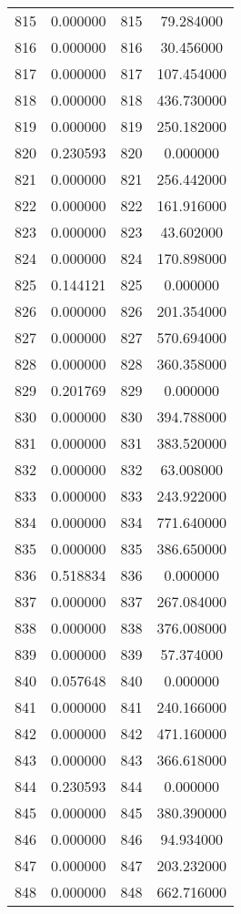\documentclass[12pt]{article}
\begin{document}
\begin{longtable}{@{}cccc@{}}
815 & 0.000000 & 815 & 79.284000 \\
816 & 0.000000 & 816 & 30.456000 \\
817 & 0.000000 & 817 & 107.454000 \\
818 & 0.000000 & 818 & 436.730000 \\
819 & 0.000000 & 819 & 250.182000 \\
820 & 0.230593 & 820 & 0.000000 \\
821 & 0.000000 & 821 & 256.442000 \\
822 & 0.000000 & 822 & 161.916000 \\
823 & 0.000000 & 823 & 43.602000 \\
824 & 0.000000 & 824 & 170.898000 \\
825 & 0.144121 & 825 & 0.000000 \\
826 & 0.000000 & 826 & 201.354000 \\
827 & 0.000000 & 827 & 570.694000 \\
828 & 0.000000 & 828 & 360.358000 \\
829 & 0.201769 & 829 & 0.000000 \\
830 & 0.000000 & 830 & 394.788000 \\
831 & 0.000000 & 831 & 383.520000 \\
832 & 0.000000 & 832 & 63.008000 \\
833 & 0.000000 & 833 & 243.922000 \\
834 & 0.000000 & 834 & 771.640000 \\
835 & 0.000000 & 835 & 386.650000 \\
836 & 0.518834 & 836 & 0.000000 \\
837 & 0.000000 & 837 & 267.084000 \\
838 & 0.000000 & 838 & 376.008000 \\
839 & 0.000000 & 839 & 57.374000 \\
840 & 0.057648 & 840 & 0.000000 \\
841 & 0.000000 & 841 & 240.166000 \\
842 & 0.000000 & 842 & 471.160000 \\
843 & 0.000000 & 843 & 366.618000 \\
844 & 0.230593 & 844 & 0.000000 \\
845 & 0.000000 & 845 & 380.390000 \\
846 & 0.000000 & 846 & 94.934000 \\
847 & 0.000000 & 847 & 203.232000 \\
848 & 0.000000 & 848 & 662.716000 \\

\end{longtable}
\end{document}

